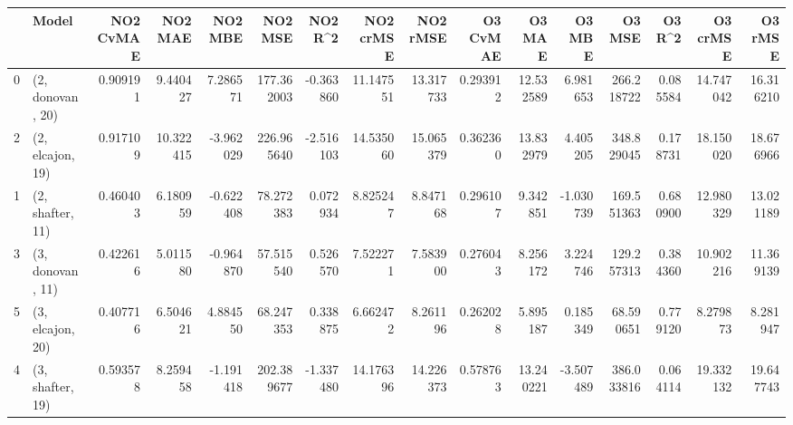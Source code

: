 \begin{tabular}{llrrrrrrrrrrrrrr}
\toprule
{} &             Model &  NO2 CvMAE &    NO2 MAE &   NO2 MBE &     NO2 MSE &   NO2 R\textasciicircum2 &  NO2 crMSE &   NO2 rMSE &  O3 CvMAE &     O3 MAE &    O3 MBE &      O3 MSE &    O3 R\textasciicircum2 &   O3 crMSE &    O3 rMSE \\
\midrule
0 &  (2, donovan, 20) &   0.909191 &   9.440427 &  7.286571 &  177.362003 & -0.363860 &  11.147551 &  13.317733 &  0.293912 &  12.532589 &  6.981653 &  266.218722 &  0.085584 &  14.747042 &  16.316210 \\
2 &  (2, elcajon, 19) &   0.917109 &  10.322415 & -3.962029 &  226.965640 & -2.516103 &  14.535060 &  15.065379 &  0.362360 &  13.832979 &  4.405205 &  348.829045 &  0.178731 &  18.150020 &  18.676966 \\
1 &  (2, shafter, 11) &   0.460403 &   6.180959 & -0.622408 &   78.272383 &  0.072934 &   8.825247 &   8.847168 &  0.296107 &   9.342851 & -1.030739 &  169.551363 &  0.680900 &  12.980329 &  13.021189 \\
3 &  (3, donovan, 11) &   0.422616 &   5.011580 & -0.964870 &   57.515540 &  0.526570 &   7.522271 &   7.583900 &  0.276043 &   8.256172 &  3.224746 &  129.257313 &  0.384360 &  10.902216 &  11.369139 \\
5 &  (3, elcajon, 20) &   0.407716 &   6.504621 &  4.884550 &   68.247353 &  0.338875 &   6.662472 &   8.261196 &  0.262028 &   5.895187 &  0.185349 &   68.590651 &  0.779120 &   8.279873 &   8.281947 \\
4 &  (3, shafter, 19) &   0.593578 &   8.259458 & -1.191418 &  202.389677 & -1.337480 &  14.176396 &  14.226373 &  0.578763 &  13.240221 & -3.507489 &  386.033816 &  0.064114 &  19.332132 &  19.647743 \\
\bottomrule
\end{tabular}
